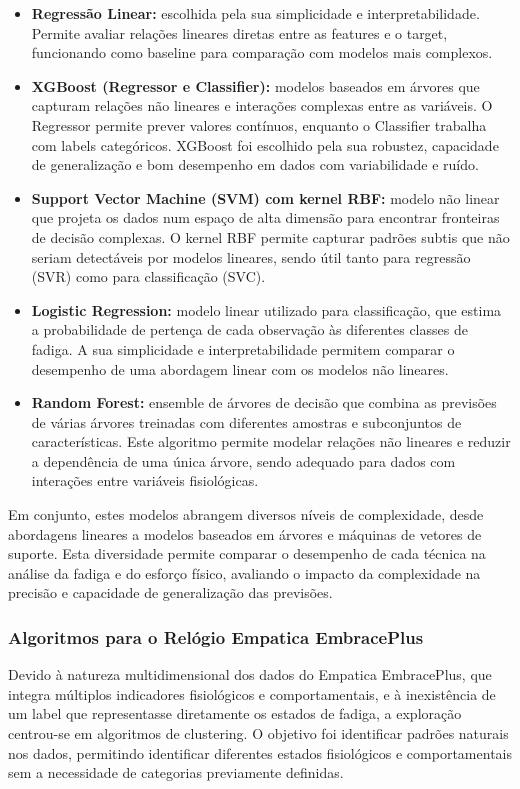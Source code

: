 \begin{itemize}
\item \textbf{Regressão Linear:} escolhida pela sua simplicidade e interpretabilidade. Permite avaliar relações lineares diretas entre as features e o target, funcionando como baseline para comparação com modelos mais complexos.
\item \textbf{XGBoost (Regressor e Classifier):} modelos baseados em árvores que capturam relações não lineares e interações complexas entre as variáveis. O Regressor permite prever valores contínuos, enquanto o Classifier trabalha com labels categóricos. XGBoost foi escolhido pela sua robustez, capacidade de generalização e bom desempenho em dados com variabilidade e ruído.
\item \textbf{Support Vector Machine (SVM) com kernel RBF:} modelo não linear que projeta os dados num espaço de alta dimensão para encontrar fronteiras de decisão complexas. O kernel RBF permite capturar padrões subtis que não seriam detectáveis por modelos lineares, sendo útil tanto para regressão (SVR) como para classificação (SVC).
\item \textbf{Logistic Regression:} modelo linear utilizado para classificação, que estima a probabilidade de pertença de cada observação às diferentes classes de fadiga. A sua simplicidade e interpretabilidade permitem comparar o desempenho de uma abordagem linear com os modelos não lineares.
\item \textbf{Random Forest:} ensemble de árvores de decisão que combina as previsões de várias árvores treinadas com diferentes amostras e subconjuntos de características. Este algoritmo permite modelar relações não lineares e reduzir a dependência de uma única árvore, sendo adequado para dados com interações entre variáveis fisiológicas.
\end{itemize}

Em conjunto, estes modelos abrangem diversos níveis de complexidade, desde abordagens lineares a modelos baseados em árvores e máquinas de vetores de suporte. Esta diversidade permite comparar o desempenho de cada técnica na análise da fadiga e do esforço físico, avaliando o impacto da complexidade na precisão e capacidade de generalização das previsões.

\subsubsection*{Algoritmos para o Relógio Empatica EmbracePlus}

Devido à natureza multidimensional dos dados do Empatica EmbracePlus, que integra múltiplos indicadores fisiológicos e comportamentais, e à inexistência de um label que representasse diretamente os estados de fadiga, a exploração centrou-se em algoritmos de clustering. O objetivo foi identificar padrões naturais nos dados, permitindo identificar diferentes estados fisiológicos e comportamentais sem a necessidade de categorias previamente definidas.

